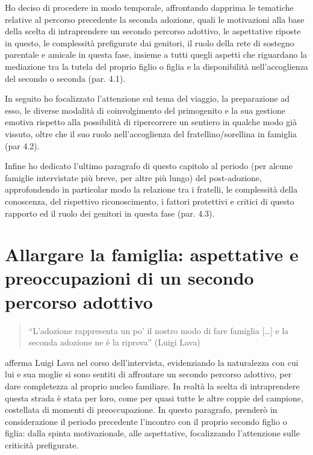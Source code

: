 \documentclass[12pt,oneside,svgnames]{memoir}
\newenvironment{quotationb}%
{\color{maincolor}\begin{leftbar}\begin{quotation}}%
{\end{quotation}\end{leftbar}\ignorespacesafterend}
\begin{document}
Ho deciso di procedere in modo temporale, affrontando dapprima le
tematiche relative al percorso precedente la seconda adozione, quali le
motivazioni alla base della scelta di intraprendere un secondo percorso
adottivo, le aspettative riposte in questo, le complessità prefigurate
dai genitori, il ruolo della rete di sostegno parentale e amicale in
questa fase, insieme a tutti quegli aspetti che riguardano la mediazione
tra la tutela del proprio figlio o figlia e la disponibilità
nell'accoglienza del secondo o seconda (par. 4.1).

In seguito ho focalizzato l'attenzione sul tema del viaggio, la
preparazione ad esso, le diverse modalità di coinvolgimento del
primogenito e la sua gestione emotiva rispetto alla possibilità di
ripercorrere un sentiero in qualche modo già vissuto, oltre che il suo
ruolo nell'accoglienza del fratellino/sorellina in famiglia (par 4.2).

Infine ho dedicato l'ultimo paragrafo di questo capitolo al periodo (per
alcune famiglie intervistate più breve, per altre più lungo) del
post-adozione, approfondendo in particolar modo la relazione tra i
fratelli, le complessità della conoscenza, del rispettivo
riconoscimento, i fattori protettivi e critici di questo rapporto ed il
ruolo dei genitori in questa fase (par. 4.3).

\section{Allargare la famiglia: aspettative e preoccupazioni di un
secondo percorso
adottivo}\label{allargare-la-famiglia-aspettative-e-preoccupazioni-di-un-secondo-percorso-adottivo}

\begin{quotationb}
``L'adozione rappresenta un po' il nostro modo di fare famiglia
{[}\ldots{}{]} e la seconda adozione ne è la riprova'' (Luigi Lava)
\end{quotationb}

afferma Luigi Lava nel corso dell'intervista, evidenziando la
naturalezza con cui lui e sua moglie si sono sentiti di affrontare un
secondo percorso adottivo, per dare completezza al proprio nucleo
familiare. In realtà la scelta di intraprendere questa strada è stata
per loro, come per quasi tutte le altre coppie del campione, costellata
di momenti di preoccupazione. In questo paragrafo, prenderò in
considerazione il periodo precedente l'incontro con il proprio secondo
figlio o figlia: dalla spinta motivazionale, alle aspettative,
focalizzando l'attenzione sulle criticità prefigurate.
\end{document}
